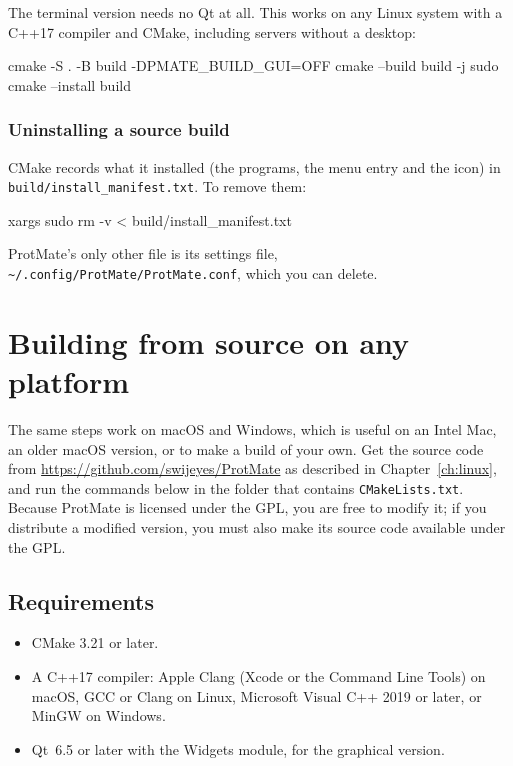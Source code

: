 \documentclass[11pt,a4paper,oneside]{report}
\newcommand{\repourl}{https://github.com/swijeyes/ProtMate}
\newcommand{\repo}{\url{\repourl}}
\newcommand{\cmd}[1]{\texttt{#1}}            %
\begin{document}
The terminal version needs no Qt at all. This works on any Linux system with a C++17 compiler and
CMake, including servers without a desktop:

\begin{terminal}
cmake -S . -B build -DPMATE_BUILD_GUI=OFF
cmake --build build -j
sudo cmake --install build
\end{terminal}

\subsection{Uninstalling a source build}

CMake records what it installed (the programs, the menu entry and the icon) in
\cmd{build/install\_manifest.txt}. To remove them:

\begin{terminal}
xargs sudo rm -v < build/install_manifest.txt
\end{terminal}

ProtMate's only other file is its settings file,
\cmd{\textasciitilde/.config/ProtMate/ProtMate.conf}, which you can delete.

\chapter{Building from source on any platform}\label{ch:source}

The same steps work on macOS and Windows, which is useful on an Intel Mac, an older macOS version,
or to make a build of your own. Get the source code from \repo{} as described in
Chapter~\ref{ch:linux}, and run the commands below in the folder that contains
\cmd{CMakeLists.txt}. Because ProtMate is licensed under the GPL, you are free to modify it; if you
distribute a modified version, you must also make its source code available under the GPL.

\section{Requirements}

\begin{itemize}
  \item CMake 3.21 or later.
  \item A C++17 compiler: Apple Clang (Xcode or the Command Line Tools) on macOS, GCC or Clang on
        Linux, Microsoft Visual C++ 2019 or later, or MinGW on Windows.
  \item Qt~6.5 or later with the Widgets module, for the graphical version.
\end{itemize}
\end{document}
